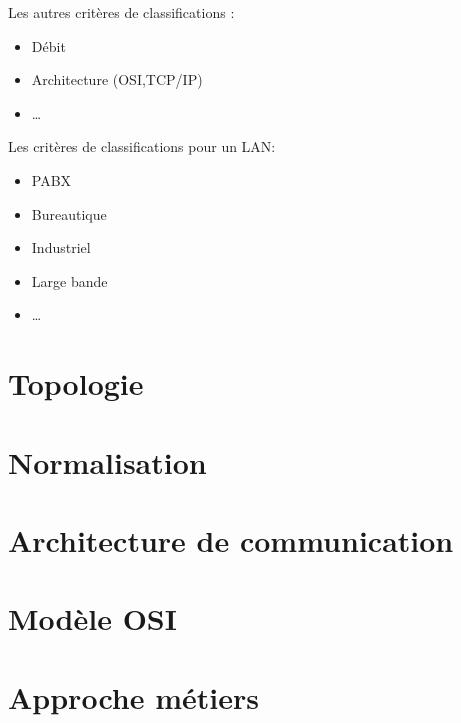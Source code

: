 \documentclass[12pt,a4paper,openany]{book}
\begin{document}
		Les autres critères de classifications : 
		\begin{itemize}
			\item Débit
			\item Architecture (OSI,TCP/IP)
			\item \ldots
		\end{itemize}

		Les critères de classifications pour un LAN: 
		\begin{itemize}
			\item PABX
			\item Bureautique
			\item Industriel
			\item Large bande
			\item \ldots
		\end{itemize}
	\chapter{Topologie}
	\chapter{Normalisation}
	\chapter{Architecture de communication}
	\chapter{Modèle OSI}
	\chapter{Approche métiers}
\end{document}
